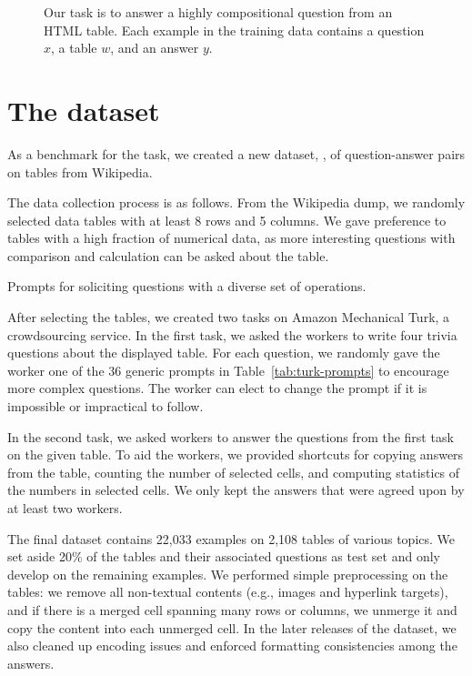 \begin{figure}[t]
\centering

\caption{Our task is to answer a highly compositional question from an HTML table.
Each example in the training data contains a question $x$,
a table $w$,
and an answer $y$.}
\label{fig:wtq-setting}
\end{figure}


\section{The \wtq dataset}\label{sec:wtq-dataset}

As a benchmark for the task,
we created a new dataset, \wtq, of question-answer pairs
on tables from Wikipedia.

The data collection process is as follows.
From the Wikipedia dump,
we randomly selected data tables with at least
8 rows and 5 columns.
We gave preference to tables with a high fraction of
numerical data, as more interesting questions
with comparison and calculation can be asked about the table.

\begin{table}[t]
\centering

\caption{Prompts for soliciting
questions with a diverse set of operations.}
\label{tab:turk-prompts}
\end{table}

After selecting the tables,
we created two tasks on Amazon Mechanical Turk,
a crowdsourcing service.
In the first task, we asked the workers to write four
trivia questions about the displayed table.
For each question,
we randomly gave the worker one of the 36 generic prompts
in Table~\ref{tab:turk-prompts}
to encourage more complex questions.
The worker can elect to change the prompt
if it is impossible or impractical to follow.

In the second task, we asked workers to answer
the questions from the first task on the given table.
To aid the workers, we provided shortcuts
for copying answers from the table,
counting the number of selected cells,
and computing statistics of the numbers in selected cells.
We only kept the answers that were agreed upon
by at least two workers.

The final dataset contains 22,033 examples
on 2,108 tables of various topics.
We set aside 20\% of the tables and their associated questions
as test set and only develop on the remaining examples.
We performed simple preprocessing on the tables:
we remove all non-textual contents
(e.g., images and hyperlink targets),
and if there is a merged cell spanning many rows or columns,
we unmerge it and copy the content into each unmerged cell.
In the later releases of the dataset,
we also cleaned up encoding issues and
enforced formatting consistencies among the answers.

